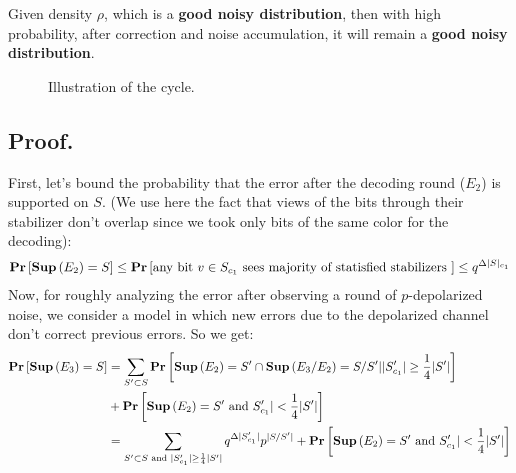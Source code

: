 \documentclass[manuscript,screen,review]{acmart}
\begin{document}
\begin{claim}
Given density $\rho$, which is a \textbf{good noisy distribution}, then with high probability, after correction and noise accumulation, it will remain a \textbf{good noisy distribution}.
\end{claim}

\begin{figure}[h]
  \begin{center}
\end{center}
\caption{Illustration of the cycle.}
\end{figure}
\subsection{Proof.}
First, let's bound the probability that the error after the decoding round ($E_{2}$) is supported on $S$. (We use here the fact that views of the bits through their stabilizer don't overlap since we took only bits of the same color for the decoding):
\begin{equation*}
  \begin{split}
    \mathbf{Pr} \left[  \mathbf{Sup}{} \left(E_{2}\right) = S  \right] \le \mathbf{Pr} \left[ \text{any bit } v\in S_{c_{1}} \text{ sees majority of statisfied stabilizers   }  \right] \le q^{\Delta |S|_{c_{1}}}
  \end{split}
\end{equation*}
Now, for roughly analyzing the error after observing a round of $p$-depolarized noise, we consider a model in which new errors due to the depolarized channel don't correct previous errors. So we get:
\begin{equation*}
  \begin{split}
    \mathbf{Pr} \left[  \mathbf{Sup}{} \left(E_{3}\right) = S    \right] &= \sum_{S^{\prime} \subset S}\mathbf{Pr} \left[   \mathbf{Sup}{} \left( E_{2} \right) = S^{\prime}  \cap \mathbf{Sup}{} \left( E_{3}/E_{2}\right) = S/S^{\prime} |  |S^{\prime}_{c_1}| \ge \frac{1}{4} |S^{\prime}|   \right]\\ 
    & + \mathbf{Pr} \left[  \mathbf{Sup}{} \left( E_{2} \right) = S^{\prime} \text{ and } S^{\prime}_{c_1}| < \frac{1}{4} |S^{\prime}| \right] \\
    & = \sum_{S^{\prime} \subset S \text{ and }  |S^{\prime}_{c_1}| \ge \frac{1}{4} |S^{\prime}|}{q^{\Delta |S^{\prime}_{c_1}|}p^{|S /S^{\prime}|} } +  \mathbf{Pr} \left[  \mathbf{Sup}{} \left( E_{2} \right) = S^{\prime} \text{ and } S^{\prime}_{c_1}| < \frac{1}{4} |S^{\prime}| \right] 
  \end{split}
\end{equation*}
\end{document}

